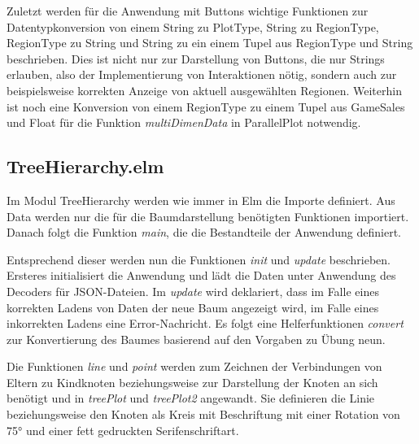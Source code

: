 \documentclass[usegeometry=true]{scrartcl}
\begin{document}
Zuletzt werden für die Anwendung mit Buttons wichtige Funktionen zur Datentypkonversion von einem String zu PlotType, String zu RegionType, RegionType zu String und String zu ein einem Tupel aus RegionType und String beschrieben. 
Dies ist nicht nur zur Darstellung von Buttons, die nur Strings erlauben, also der Implementierung von Interaktionen nötig, sondern auch zur beispielsweise korrekten Anzeige von aktuell ausgewählten Regionen.
Weiterhin ist noch eine Konversion von einem RegionType zu einem Tupel aus GameSales und Float für die Funktion \textit{multiDimenData} in ParallelPlot notwendig.

\subsection{TreeHierarchy.elm}
Im Modul TreeHierarchy werden wie immer in Elm die Importe definiert. Aus Data werden nur die für die Baumdarstellung benötigten Funktionen importiert. 
Danach folgt die Funktion \textit{main}, die die Bestandteile der Anwendung definiert. 

Entsprechend dieser werden nun die Funktionen \textit{init} und \textit{update} beschrieben. 
Ersteres initialisiert die Anwendung und lädt die Daten unter Anwendung des Decoders für JSON-Dateien. 
Im \textit{update} wird deklariert, dass im Falle eines korrekten Ladens von Daten der neue Baum angezeigt wird, im Falle eines inkorrekten Ladens eine Error-Nachricht. 
Es folgt eine Helferfunktionen \textit{convert} zur Konvertierung des Baumes basierend auf den Vorgaben zu Übung neun.

Die Funktionen \textit{line} und \textit{point} werden zum Zeichnen der Verbindungen von Eltern zu Kindknoten beziehungsweise zur Darstellung der Knoten an sich benötigt und in \textit{treePlot} und \textit{treePlot2} angewandt. 
Sie definieren die Linie beziehungsweise den Knoten als Kreis mit Beschriftung mit einer Rotation von 75° und einer fett gedruckten Serifenschriftart.
\end{document}
